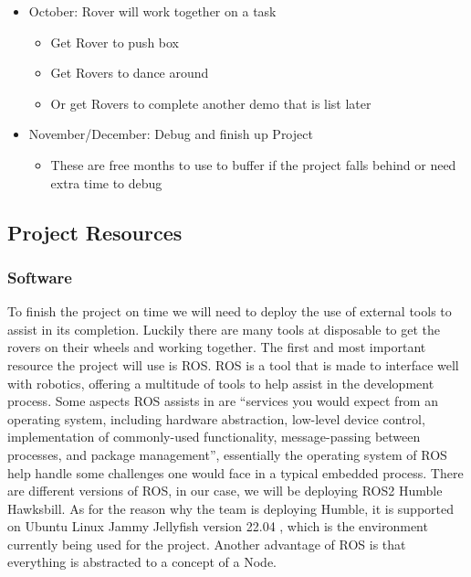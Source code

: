 \documentclass[conference]{IEEEtran}
\begin{document}
\begin{itemize}
\begin{itemize}
	\end{itemize}
	\item October: Rover will work together on a task
	\begin{itemize}
		\item Get Rover to push box
		\item Get Rovers to dance around
		\item Or get Rovers to complete another demo that is list later
	\end{itemize}
	\item November/December: Debug and finish up Project
	\begin{itemize}
		\item These are free months to use to buffer if the project falls behind or need extra time to debug
	\end{itemize}
\end{itemize}
\subsection{Project Resources}
\subsubsection{Software}
To finish the project on time we will need to deploy the use of external tools to assist in its completion. Luckily there are many tools at disposable to get the rovers on their wheels and working together. The first and most important resource the project will use is ROS. ROS is a tool that is made to interface well with robotics, offering a multitude of tools to help assist in the development process. Some aspects ROS assists in are “services you would expect from an operating system, including hardware abstraction, low-level device control, implementation of commonly-used functionality, message-passing between processes, and package management”\cite{RN200}, essentially the operating system of ROS help handle some challenges one would face in a typical embedded process. There are different versions of ROS, in our case, we will be deploying ROS2 Humble Hawksbill. As for the reason why the team is deploying Humble, it is supported on Ubuntu Linux Jammy Jellyfish version 22.04 \cite{RN201}, which is the environment currently being used for the project. Another advantage of ROS is that everything is abstracted to a concept of a Node.
\end{document}
